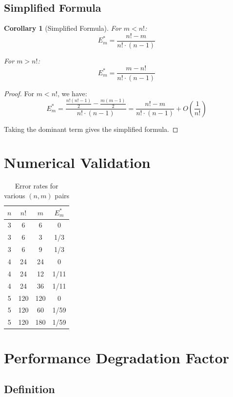 \documentclass[11pt]{article}
\newtheorem{corollary}[theorem]{Corollary}
\begin{document}
\subsection{Simplified Formula}

\begin{corollary}[Simplified Formula]
For $m < n!$:
$$\boxed{E_m^* = \frac{n! - m}{n! \cdot (n-1)}}$$

For $m > n!$:
$$\boxed{E_m^* = \frac{m - n!}{n! \cdot (n-1)}}$$
\end{corollary}

\begin{proof}
For $m < n!$, we have:
$$E_m^* = \frac{\frac{n!(n!-1)}{2} - \frac{m(m-1)}{2}}{n! \cdot (n-1)} = \frac{n! - m}{n! \cdot (n-1)} + O\left(\frac{1}{n!}\right)$$

Taking the dominant term gives the simplified formula.
\end{proof}

\section{Numerical Validation}

\begin{table}[h]
\centering
\caption{Error rates for various $(n, m)$ pairs}
\begin{tabular}{cccc}
\toprule
$n$ & $n!$ & $m$ & $E_m^*$ \\
\midrule
3 & 6 & 6 & 0 \\
3 & 6 & 3 & 1/3 \\
3 & 6 & 9 & 1/3 \\
4 & 24 & 24 & 0 \\
4 & 24 & 12 & 1/11 \\
4 & 24 & 36 & 1/11 \\
5 & 120 & 120 & 0 \\
5 & 120 & 60 & 1/59 \\
5 & 120 & 180 & 1/59 \\
\bottomrule
\end{tabular}
\end{table}

\section{Performance Degradation Factor}

\subsection{Definition}
\end{document}
